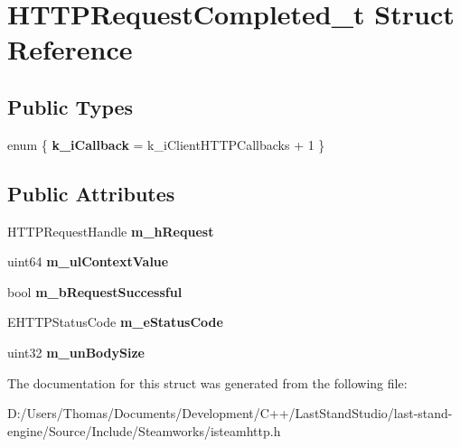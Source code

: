 \hypertarget{structHTTPRequestCompleted__t}{}\section{H\+T\+T\+P\+Request\+Completed\+\_\+t Struct Reference}
\label{structHTTPRequestCompleted__t}
\subsection*{Public Types}
\begin{DoxyCompactItemize}
\item 
\hypertarget{structHTTPRequestCompleted__t_a780e0d04b05125b32f7206229cd825d5}{}enum \{ {\bfseries k\+\_\+i\+Callback} = k\+\_\+i\+Client\+H\+T\+T\+P\+Callbacks + 1
 \}\label{structHTTPRequestCompleted__t_a780e0d04b05125b32f7206229cd825d5}

\end{DoxyCompactItemize}
\subsection*{Public Attributes}
\begin{DoxyCompactItemize}
\item 
\hypertarget{structHTTPRequestCompleted__t_a8a7995a1213af71cb88aee47dc07759c}{}H\+T\+T\+P\+Request\+Handle {\bfseries m\+\_\+h\+Request}\label{structHTTPRequestCompleted__t_a8a7995a1213af71cb88aee47dc07759c}

\item 
\hypertarget{structHTTPRequestCompleted__t_a8cbd6bf571cd7494128d55c571c05b4a}{}uint64 {\bfseries m\+\_\+ul\+Context\+Value}\label{structHTTPRequestCompleted__t_a8cbd6bf571cd7494128d55c571c05b4a}

\item 
\hypertarget{structHTTPRequestCompleted__t_a40c2f0337b259d879c51080da4687da8}{}bool {\bfseries m\+\_\+b\+Request\+Successful}\label{structHTTPRequestCompleted__t_a40c2f0337b259d879c51080da4687da8}

\item 
\hypertarget{structHTTPRequestCompleted__t_ab383bb6ba67d9ad42e48240c8cb6dd78}{}E\+H\+T\+T\+P\+Status\+Code {\bfseries m\+\_\+e\+Status\+Code}\label{structHTTPRequestCompleted__t_ab383bb6ba67d9ad42e48240c8cb6dd78}

\item 
\hypertarget{structHTTPRequestCompleted__t_adce7ede47bfc556894b38034549931bf}{}uint32 {\bfseries m\+\_\+un\+Body\+Size}\label{structHTTPRequestCompleted__t_adce7ede47bfc556894b38034549931bf}

\end{DoxyCompactItemize}


The documentation for this struct was generated from the following file\+:\begin{DoxyCompactItemize}
\item 
D\+:/\+Users/\+Thomas/\+Documents/\+Development/\+C++/\+Last\+Stand\+Studio/last-\/stand-\/engine/\+Source/\+Include/\+Steamworks/isteamhttp.\+h\end{DoxyCompactItemize}
